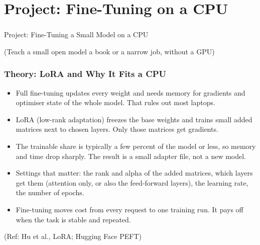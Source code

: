 
\section[CPU Fine-Tune]{Project: Fine-Tuning on a CPU}

\begin{frame}[fragile]\frametitle{}
\begin{center}
{\Large Project: Fine-Tuning a Small Model on a CPU}

\medskip
{\small (Teach a small open model a book or a narrow job, without a GPU)}
\end{center}
\end{frame}

\begin{frame}[fragile]\frametitle{Theory: LoRA and Why It Fits a CPU}
\begin{itemize}
\item Full fine-tuning updates every weight and needs memory for gradients and optimiser state of the whole model. That rules out most laptops.
\item LoRA (low-rank adaptation) freezes the base weights and trains small added matrices next to chosen layers. Only those matrices get gradients.
\item The trainable share is typically a few percent of the model or less, so memory and time drop sharply. The result is a small adapter file, not a new model.
\item Settings that matter: the rank and alpha of the added matrices, which layers get them (attention only, or also the feed-forward layers), the learning rate, the number of epochs.
\item Fine-tuning moves cost from every request to one training run. It pays off when the task is stable and repeated.
\end{itemize}
{\tiny (Ref: Hu et al., LoRA; Hugging Face PEFT)}
\end{frame}


